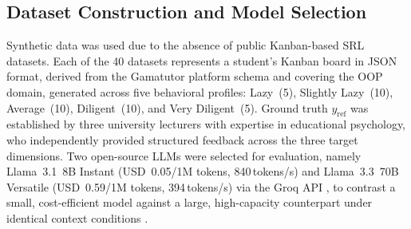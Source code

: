 \documentclass[conference,a4paper]{IEEEtran}
\begin{document}

\subsection{Dataset Construction and Model Selection}
\label{sec:dataset}

%
%
%

Synthetic data was used due to the absence of public
Kanban-based SRL datasets. Each of the 40 datasets
represents a student's Kanban board in JSON format,
derived from the Gamatutor platform schema and covering
the OOP domain, generated across five behavioral
profiles: Lazy~(5), Slightly Lazy~(10), Average~(10),
Diligent~(10), and Very Diligent~(5). Ground truth
$y_{\text{ref}}$ was established by three university
lecturers with expertise in educational psychology, who
independently provided structured feedback across the
three target dimensions. Two open-source LLMs were
selected for evaluation, namely Llama~3.1~8B Instant
(USD~0.05/1M tokens, 840\,tokens/s) and Llama~3.3~70B Versatile
(USD~0.59/1M tokens, 394\,tokens/s) via the Groq API
\cite{groq_pricing}, to contrast a small, cost-efficient
model against a large, high-capacity counterpart under
identical context conditions \cite{tang2025fewshot,
pawlik2025choice}.
\end{document}
